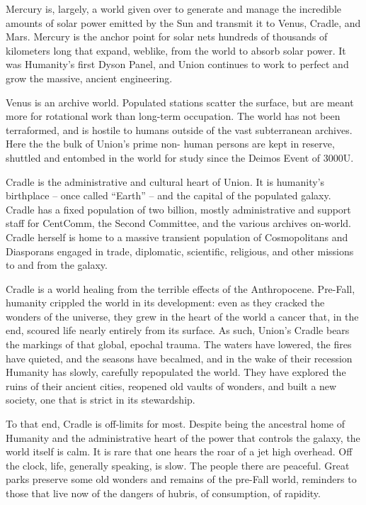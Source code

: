 Mercury is, largely, a world given over to generate and manage the incredible amounts of solar  
power emitted by the Sun and transmit it to Venus, Cradle, and Mars. Mercury is the anchor  
point for solar nets hundreds of thousands of kilometers long that expand, weblike, from the  
world to absorb solar power. It was Humanity’s first Dyson Panel, and Union continues to work to  
perfect and grow the massive, ancient engineering. 
 

Venus is an archive world. Populated stations scatter the surface, but are meant more for  
rotational work than long-term occupation. The world has not been terraformed, and is hostile to  
humans outside of the vast subterranean archives. Here the the bulk of Union’s prime non- 
human persons are kept in reserve, shuttled and entombed in the world for study since the  
Deimos Event of 3000U.  
 

Cradle is the administrative and cultural heart of Union. It is humanity’s birthplace -- once called  
“Earth” -- and the capital of the populated galaxy. Cradle has a fixed population of two billion,  
mostly administrative and support staff for CentComm, the Second Committee,  and the various  
archives on-world. Cradle herself is home to a massive transient population of Cosmopolitans  
and Diasporans engaged in trade, diplomatic, scientific, religious, and other missions to and from  
the galaxy.
 

Cradle is a world healing from the terrible effects of the Anthropocene. Pre-Fall, humanity  
crippled the world in its development: even as they cracked the wonders of the universe, they  
grew in the heart of the world a cancer that, in the end, scoured life nearly entirely from its  
surface. As such, Union’s Cradle bears the markings of that global, epochal trauma. The waters  
have lowered, the fires have quieted, and the seasons have becalmed, and in the wake of their  
recession Humanity has slowly, carefully repopulated the world. They have explored the ruins of  
their ancient cities, reopened old vaults of wonders, and built a new society, one that is strict in  
its stewardship. 
 

To that end, Cradle is off-limits for most. Despite being the ancestral home of Humanity and the  
administrative heart of the power that controls the galaxy, the world itself is calm. It is rare that  
one hears the roar of a jet high overhead. Off the clock, life, generally speaking, is slow. The  
people there are peaceful. Great parks preserve some old wonders and remains of the pre-Fall  
world, reminders to those that live now of the dangers of hubris, of consumption, of rapidity. 
 

